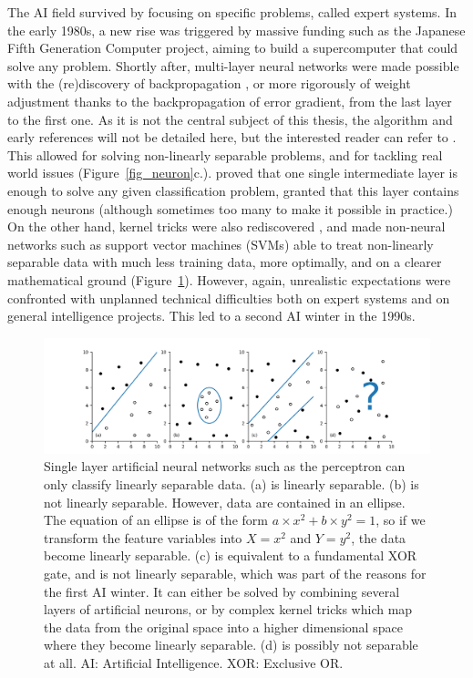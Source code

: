 The AI field survived by focusing on specific problems, called expert systems. In the early 1980s, a new rise was triggered by massive funding such as the Japanese Fifth Generation Computer project, aiming to build a supercomputer that could solve any problem. Shortly after, multi-layer neural networks were made possible with the (re)discovery of backpropagation \cite{Rumelhart1986}, or more rigorously of weight adjustment thanks to the backpropagation of error gradient, from the last layer to the first one. As it is not the central subject of this thesis, the algorithm and early references will not be detailed here, but the interested reader can refer to \cite{Goodfellow2016}. This allowed for solving non-linearly separable problems, and for tackling real world issues (Figure~\ref{fig_neuron}c.). \cite{Cybenko1989} proved that one single intermediate layer is enough to solve any given classification problem, granted that this layer contains enough neurons (although sometimes too many to make it possible in practice.) On the other hand, kernel tricks were also rediscovered \cite{Aizerman1964,Hofmann2008}, and made non-neural networks such as support vector machines (SVMs) \cite{Boser1992} able to treat non-linearly separable data with much less training data, more optimally, and on a clearer mathematical ground (Figure~\ref{fig_linearly_sep}). However, again, unrealistic expectations were confronted with unplanned technical difficulties both on expert systems and on general intelligence projects. This led to a second AI winter in the 1990s. 


\begin{figure}[hbtp]
	\centering
	\def\svgwidth{1\columnwidth}
	\fontsize{10pt}{10pt}\selectfont
	\includegraphics[width=1\linewidth]{"../Chap2/Figures/Fig_linearly_sep.png"}
	\caption{Single layer artificial neural networks such as the perceptron can only classify linearly separable data. (a) is linearly separable. (b) is not linearly separable. However, data are contained in an ellipse. The equation of an ellipse is of the form \(a \times x^2+b\times y^2=1\), so if we transform the feature variables into \(X=x^2\) and \(Y=y^2\), the data become linearly separable. (c) is equivalent to a fundamental XOR gate, and is not linearly separable, which was part of the reasons for the first AI winter. It can either be solved by combining several layers of artificial neurons, or by complex kernel tricks which map the data from the original space into a higher dimensional space where they become linearly separable. (d) is possibly not separable at all. AI: Artificial Intelligence. XOR: Exclusive OR.} 
	\label{fig_linearly_sep}
\end{figure}

